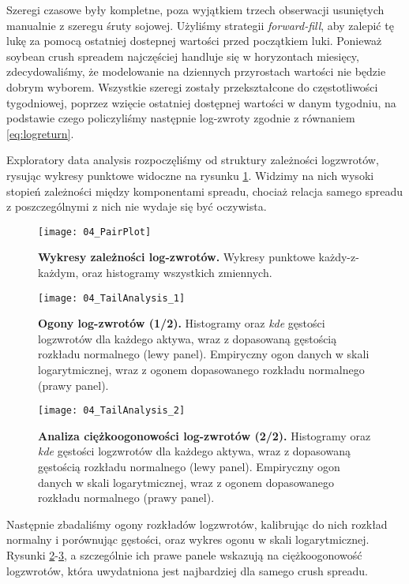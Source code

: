Szeregi czasowe były kompletne, poza wyjątkiem trzech obserwacji usuniętych manualnie z szeregu śruty sojowej. Użyliśmy strategii \emph{forward-fill}, aby zalepić tę lukę za pomocą ostatniej dostepnej wartości przed początkiem luki. Ponieważ soybean crush spreadem najczęściej handluje się w horyzontach miesięcy, zdecydowaliśmy, że modelowanie na dziennych przyrostach wartości nie będzie dobrym wyborem. Wszystkie szeregi zostały przekształcone do częstotliwości tygodniowej, poprzez wzięcie ostatniej dostępnej wartości w danym tygodniu, na podstawie czego policzyliśmy następnie log-zwroty zgodnie z równaniem \ref{eq:logreturn}.

Exploratory data analysis rozpoczęliśmy od struktury zależności logzwrotów, rysując wykresy punktowe widoczne na rysunku \ref{fig:pairplot_original_scale}. Widzimy na nich wysoki stopień zależności między komponentami spreadu, chociaż relacja samego spreadu z poszczególnymi z nich nie wydaje się być oczywista.

\begin{figure}[h]
	\centering
	\texttt{[image: 04\_PairPlot]}
	\caption{\textbf{Wykresy zależności log-zwrotów.} Wykresy punktowe każdy-z-każdym, oraz histogramy wszystkich zmiennych. \label{fig:pairplot_original_scale}}
\end{figure}

\begin{figure}[h]
	\centering
	\texttt{[image: 04\_TailAnalysis\_1]}
	\caption{\textbf{Ogony log-zwrotów (1/2).} Histogramy oraz \emph{kde} gęstości logzwrotów dla każdego aktywa, wraz z dopasowaną gęstością rozkładu normalnego (lewy panel). Empiryczny ogon danych w skali logarytmicznej, wraz z ogonem dopasowanego rozkładu normalnego (prawy panel). \label{fig:tail_analysis_01}}
\end{figure}

\begin{figure}[h]
	\centering
	\texttt{[image: 04\_TailAnalysis\_2]}
	\caption{\textbf{Analiza ciężkoogonowości log-zwrotów (2/2).} Histogramy oraz \emph{kde} gęstości logzwrotów dla każdego aktywa, wraz z dopasowaną gęstością rozkładu normalnego (lewy panel). Empiryczny ogon danych w skali logarytmicznej, wraz z ogonem dopasowanego rozkładu normalnego (prawy panel). \label{fig:tail_analysis_02}}
\end{figure}

Następnie zbadaliśmy ogony rozkładów logzwrotów, kalibrując do nich rozkład normalny i porównując gęstości, oraz wykres ogonu w skali logarytmicznej. Rysunki \ref{fig:tail_analysis_01}-\ref{fig:tail_analysis_02}, a szczególnie ich prawe panele wskazują na ciężkoogonowość logzwrotów, która uwydatniona jest najbardziej dla samego crush spreadu.\\


